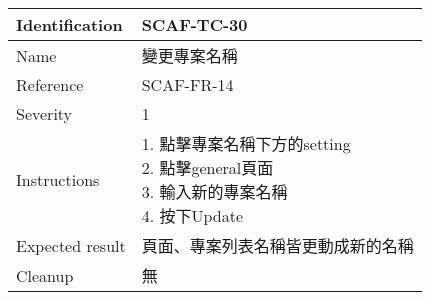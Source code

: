 \documentclass{report}
\begin{document}

\begin{tabularx}{0.9\textwidth}{
  |p{}%
  |p{}|%
  }
  \hline
  \centering Identification &  SCAF-TC-30 \\
  \hline
  \centering Name & 變更專案名稱 \\
  \hline
  \centering Reference & SCAF-FR-14 \\
  \hline
  \centering Severity & 1 \\
  \hline
  \centering Instructions & 
  \makecell{
    1. 點擊專案名稱下方的setting \\
    2. 點擊general頁面 \\
    3. 輸入新的專案名稱 \\
    4. 按下Update 
  }\\
  \hline
  \centering Expected result & 頁面、專案列表名稱皆更動成新的名稱 \\
  \hline
  \centering Cleanup & 無 \\
  \hline
\end{tabularx}
\newline\newline
\end{document}
